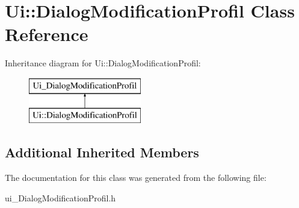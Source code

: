 \section{Ui\-:\-:Dialog\-Modification\-Profil Class Reference}
\label{class_ui_1_1_dialog_modification_profil}
Inheritance diagram for Ui\-:\-:Dialog\-Modification\-Profil\-:\begin{figure}[H]
\begin{center}
\leavevmode
\includegraphics[height=2.000000cm]{class_ui_1_1_dialog_modification_profil}
\end{center}
\end{figure}
\subsection*{Additional Inherited Members}


The documentation for this class was generated from the following file\-:\begin{DoxyCompactItemize}
\item 
ui\-\_\-\-Dialog\-Modification\-Profil.\-h\end{DoxyCompactItemize}
